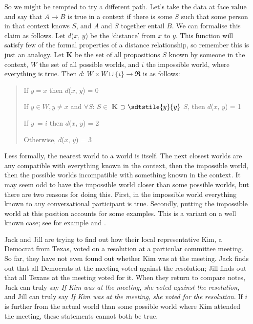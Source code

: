 So we might be tempted to try a different path. Let's take the data at face value and say that \(A \rightarrow B\) is true in a context if there is some \(S\) such that some person in that context knows \(S\), and \(A\) and \(S\) together entail \(B\). We can formalise this claim as follows. Let \(d\)(\(x\), \(y\)) be the `distance' from \(x\) to \(y\). This function will satisfy few of the formal properties of a distance relationship, so remember this is just an analogy. Let \textbf{K} be the set of all propositions \(S\) known by someone in the context, \(W\) the set of all possible worlds, and \(i\) the impossible world, where everything is true. Then \(d\): \(W \times W \cup \{i\} \rightarrow \Re\) is as follows:

\begin{quote}
If \(y = x\) then \(d\)(\(x\), \(y\)) = 0

If \(y \in W, y \neq x\) and \(\forall S\): \(S \in\) \textbf{K} \(\supset \sdtstile{y}{y}\) \(S\), then \(d\)(\(x\), \(y\)) = 1

If \(y\)~= \(i\) then \(d\)(\(x\), \(y\)) = 2

Otherwise, \(d\)(\(x\), \(y\)) = 3
\end{quote}

\noindent Less formally, the nearest world to a world is itself. The next closest worlds are any compatible with everything known in the context, then the impossible world, then the possible worlds incompatible with something known in the context. It may seem odd to have the impossible world closer than some possible worlds, but there are two reasons for doing this. First, in the impossible world everything known to any conversational participant is true. Secondly, putting the impossible world at this position accounts for some examples. This is a variant on a well known case; see for example \citet{Gibbard1981} and \citet{Barker1997}.

Jack and Jill are trying to find out how their local representative Kim, a Democrat from Texas, voted on a resolution at a particular committee meeting. So far, they have not even found out whether Kim was at the meeting. Jack finds out that all Democrats at the meeting voted against the resolution; Jill finds out that all Texans at the meeting voted for it. When they return to compare notes, Jack can truly say \textit{If Kim was at the meeting, she voted against the resolution}, and Jill can truly say \textit{If Kim was at the meeting, she voted for the resolution}. If \(i\) is further from the actual world than some possible world where Kim attended the meeting, these statements cannot both be true. 

